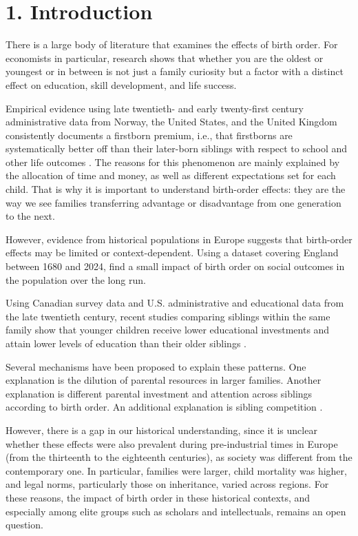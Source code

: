 \setcounter{section}{3}
\section*{1. Introduction}

There is a large body of literature that examines the effects of birth order. For economists in particular, research shows that whether you are the oldest or youngest or in between is not just a family curiosity but a factor with a distinct effect on education, skill development, and life success.

Empirical evidence using late twentieth- and early twenty-first century administrative data from Norway, the United States, and the United Kingdom consistently documents a firstborn premium, i.e., that firstborns are systematically better off than their later-born siblings with respect to school and other life outcomes \citep{Black2005,Behrman1986,Booth2009}. The reasons for this phenomenon are mainly explained by the allocation of time and money, as well as different expectations set for each child. That is why it is important to understand birth-order effects: they are the way we see families transferring advantage or disadvantage from one generation to the next.

However, evidence from historical populations in Europe suggests that birth-order effects may be limited or context-dependent. Using a dataset covering England between 1680 and 2024, \citet{ClarkCummins2024} find a small impact of birth order on social outcomes in the population over the long run.

Using Canadian survey data and U.S. administrative and educational data from the late twentieth century, recent studies comparing siblings within the same family show that younger children receive lower educational investments and attain lower levels of education than their older siblings \citep{Kantarevic2006, Hotz2015}.

Several mechanisms have been proposed to explain these patterns. One explanation is the dilution of parental resources in larger families. Another explanation is different parental investment and attention across siblings according to birth order. An additional explanation is sibling competition \citep{Becker1976, Blake1981, Price2008}. 

However, there is a gap in our historical understanding, since it is unclear whether these effects were also prevalent during pre-industrial times in Europe (from the thirteenth to the eighteenth centuries), as society was different from the contemporary one. In particular, families were larger, child mortality was higher, and legal norms, particularly those on inheritance, varied across regions. For these reasons, the impact of birth order in these historical contexts, and especially among elite groups such as scholars and intellectuals, remains an open question.

